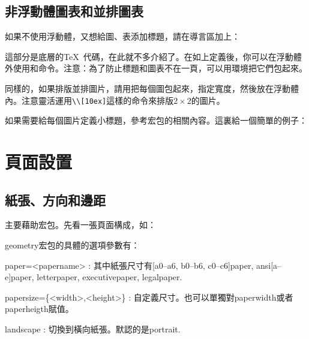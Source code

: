 \subsection{非浮動體圖表和並排圖表}
如果不使用浮動體，又想給圖、表添加標題，請在導言區加上：
\begin{latex}
\makeatletter
\newcommand\figcaption{\def\@captype{figure}\caption}
\newcommand\tabcaption{\def\@captype{table}\caption}
\makeatother
\end{latex}

這部分是底層的\TeX\ 代碼，在此就不多介紹了。在如上定義後，你可以在浮動體外使用和命令。注意：為了防止標題和圖表不在一頁，可以用環境把它們包起來。

同樣的，如果排版並排圖片，請用把每個圖包起來，指定寬度，然後放在浮動體內。注意靈活運用\verb|\\[10ex]|這樣的命令來排版$2\times 2$的圖片。

如果需要給每個圖片定義小標題，參考宏包的相關內容。這裏給一個簡單的例子：
\begin{latex}
\begin{figure}
\centering
\subfloat[...]{\label{sub-fig-1}
    \begin{minipage}
    \centering
    \texttt{[image: ...]}
    \end{minipage}}
\quad\subfloat[...]
\end{latex}

\section{頁面設置}
\label{sec:geometry}
\subsection{紙張、方向和邊距}
主要藉助宏包。先看一張頁面構成，如：
\begin{figure}
\centering

\label{fig:geo-paper}
\end{figure}

geometry宏包的具體的選項參數有：
\begin{para}
\item[paper=<papername>]: 其中紙張尺寸有[a0--a6, b0--b6, c0--c6]paper, ansi[a--e]paper, letterpaper, executivepaper, legalpaper.
\item[papersize=\{<width>,<height>\}]: 自定義尺寸。也可以單獨對paperwidth或者paperheigth賦值。
\item[landscape]: 切換到橫向紙張。默認的是portrait.
\end{para}

